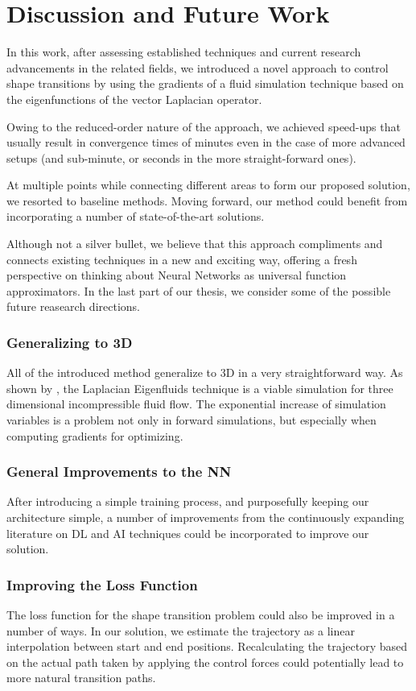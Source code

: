 \chapter{Discussion and Future Work}\label{chapter:discussion}
In this work, after assessing established techniques and current research
advancements in the related fields, we introduced a novel approach to control
shape transitions by using the gradients of a fluid simulation technique based
on the eigenfunctions of the vector Laplacian operator. 

Owing to the reduced-order nature of the approach, we achieved speed-ups that
usually result in convergence times of minutes even in the case of more advanced
setups (and sub-minute, or seconds in the more straight-forward ones).

At multiple points while connecting different areas to form our proposed
solution, we resorted to baseline methods. Moving forward, our method could
benefit from incorporating a number of state-of-the-art solutions.

Although not a silver bullet, we believe that this approach compliments and
connects existing techniques in a new and exciting way, offering a fresh
perspective on thinking about Neural Networks as universal function
approximators. In the last part of our thesis, we consider some of the possible
future reasearch directions. 

\subsection*{Generalizing to 3D}
All of the introduced method generalize to 3D in a very straightforward way. As
shown by \cite{scalable-eigenfluids}, the Laplacian Eigenfluids technique is
a viable simulation for three dimensional incompressible fluid flow. The
exponential increase of simulation variables is a problem not only in forward
simulations, but especially when computing gradients for optimizing. 

\subsection*{General Improvements to the NN}
After introducing a simple training process, and purposefully keeping our
architecture simple, a number of improvements from the continuously expanding
literature on \ac{DL} and \ac{AI} techniques could be incorporated to improve
our solution.

\subsection*{Improving the Loss Function}
The loss function for the shape transition problem could also be improved in
a number of ways. In our solution, we estimate the trajectory as a linear
interpolation between start and end positions. Recalculating the trajectory
based on the actual path taken by applying the control forces could potentially
lead to more natural transition paths.

